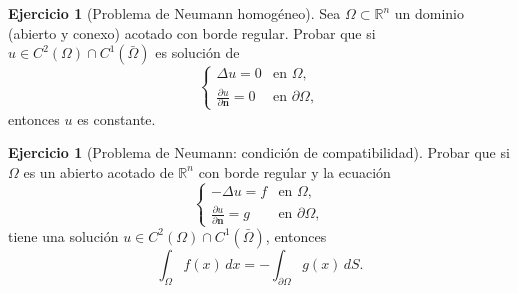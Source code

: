\documentclass[12pt, a4paper]{amsbook}
\newcommand{\R}{{\mathbb R}}
\newcommand{\n}{{\mathbf n}}
\theoremstyle{remark}
\theoremstyle{definition}
\newtheorem{ejer}[teo]{Ejercicio}
\numberwithin{section}{chapter}
\numberwithin{subsection}{section}
\numberwithin{equation}{section}
\numberwithin{figure}{chapter}
\begin{document}
\begin{ejer}[Problema de Neumann homogéneo]  Sea $\Omega\subset\R^n$ un dominio (abierto y conexo) acotado con borde regular. Probar que si $u\in C^2(\Omega)\cap C^1(\bar{\Omega})$ es solución de
$$\begin{cases}
\Delta u = 0 & \text{en } \Omega,\\
\frac{\partial u}{\partial \n}  = 0 & \text{en } \partial \Omega,
\end{cases}$$
entonces $u$ es constante.
\end{ejer}

\begin{ejer}[Problema de Neumann: condición de compatibilidad] Probar que si $\Omega$ es un abierto acotado de $\R^n$ con borde regular y la ecuación
$$\begin{cases}
-\Delta u = f & \text{en } \Omega, \\
\frac{\partial u}{\partial \n} = g & \text{en } \partial \Omega,
\end{cases}$$
tiene una solución $u\in C^2(\Omega)\cap C^1(\bar{\Omega})$, entonces
$$
\int_{\Omega}f(x)\,dx=-\int_{\partial \Omega}g(x)\, dS.
$$
\end{ejer}


 
 
%

%
\end{document}
